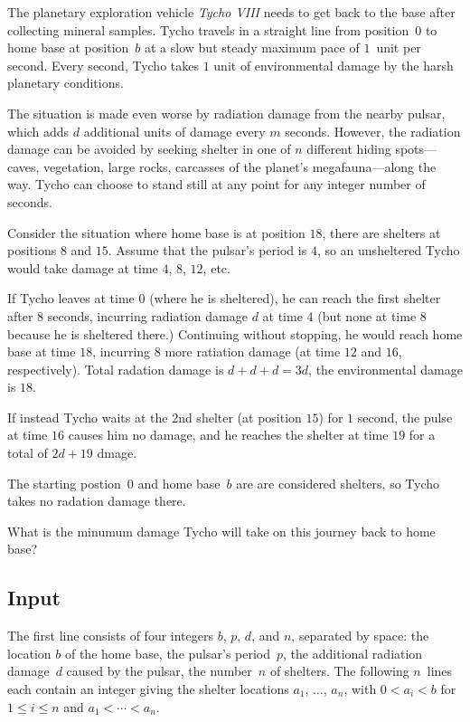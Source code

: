 
The planetary exploration vehicle \emph{Tycho VIII} needs to get back to the base after collecting mineral samples.
Tycho travels in a straight line from position~$0$ to home base at position~$b$ at a slow but steady maximum pace of $1$~unit per second.
Every second, Tycho takes $1$ unit of environmental damage by the harsh planetary conditions.

The situation is made even worse by radiation damage from the nearby pulsar, which adds $d$ additional units of damage every $m$ seconds.
However, the radiation damage can be avoided by seeking shelter in one of $n$ different hiding spots---caves, vegetation, large rocks, carcasses of the planet's megafauna---along the way.
Tycho can choose to stand still at any point for any integer number of seconds.

Consider the situation where home base is at position $18$, there are shelters at positions $8$ and $15$.
Assume that the pulsar's period is $4$, so an unsheltered Tycho would take damage at time $4$, $8$, $12$, etc.

If Tycho leaves at time $0$ (where he is sheltered), he can reach the first shelter after $8$ seconds, incurring radiation damage $d$ at time $4$ (but none at time $8$ because he is sheltered there.)
Continuing without stopping, he would reach home base at time $18$, incurring $8$ more ratiation damage (at time $12$ and $16$, respectively).
Total radation damage is $d+d+d=3d$, the environmental damage is $18$.

If instead Tycho waits at the $2$nd shelter (at position $15$) for $1$ second, the pulse at time $16$ causes him no damage, and he reaches the shelter at time $19$ for a total of $2d + 19$ dmage.

The starting postion~$0$ and home base~$b$ are are considered shelters, so Tycho takes no radation damage there.

\medskip
What is the minumum damage Tycho will take on this journey back to home base?

\subsection*{Input}

The first line consists of four integers $b$, $p$, $d$, and $n$, separated by space:
the location $b$ of the home base,
the pulsar's period~$p$,
the additional radiation damage~$d$ caused by the pulsar,
the number~$n$ of shelters.
The following $n$~lines each contain an integer giving the shelter locations $a_1$, $\ldots$, $a_n$, with 
$0<a_i< b$ for $1\leq i \leq n$ %
and 
$a_1<\cdots <a_n$. %

